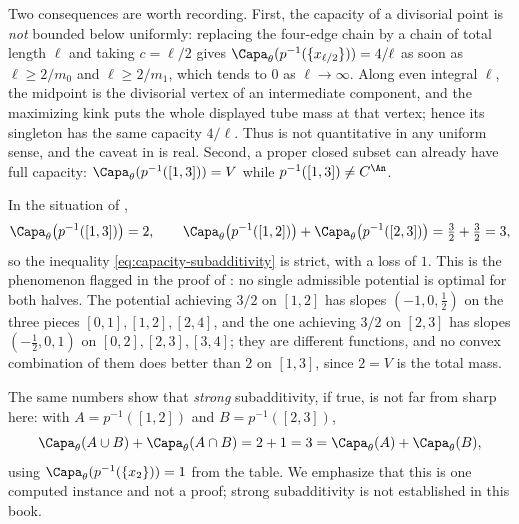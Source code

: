 \begin{example}
Two consequences are worth recording.  First, the capacity of a divisorial
point is \emph{not} bounded below uniformly: replacing the four-edge chain
by a chain of total length $\ell$ and taking $c=\ell/2$ gives
$\Capa_\theta(p^{-1}(\{x_{\ell/2}\}))=4/\ell$ as soon as
$\ell\geq2/m_0$ and $\ell\geq2/m_1$, which tends to $0$ as
$\ell\to\infty$.  Along even integral $\ell$, the midpoint is the
divisorial vertex of an intermediate component, and the maximizing kink
puts the whole displayed tube mass at that vertex; hence its singleton has
the same capacity $4/\ell$.  Thus
 is not
quantitative in any uniform sense, and the caveat in
 is real.  Second, a proper closed subset
can already have full capacity: $\Capa_\theta(p^{-1}([1,3]))=V$ while
$p^{-1}([1,3])\neq C^{\An}$.
\end{example}

\begin{example}
\label{ex:ch25-subadditivity-strict}
In the situation of ,
\[
 \Capa_\theta\bigl(p^{-1}([1,3])\bigr)=2,
 \qquad
 \Capa_\theta\bigl(p^{-1}([1,2])\bigr)
 +\Capa_\theta\bigl(p^{-1}([2,3])\bigr)=\tfrac32+\tfrac32=3 ,
\]
so the inequality \eqref{eq:capacity-subadditivity} is strict, with a loss of
$1$.  This is the phenomenon flagged in the proof of
: no single admissible potential is optimal
for both halves.  The potential achieving $3/2$ on $[1,2]$ has slopes
$(-1,0,\tfrac12)$ on the three pieces $[0,1],[1,2],[2,4]$, and the one
achieving $3/2$ on $[2,3]$ has slopes
$(-\tfrac12,0,1)$ on $[0,2],[2,3],[3,4]$; they are different functions,
and no convex combination of them does better than $2$ on $[1,3]$, since
$2=V$ is the total mass.

The same numbers show that \emph{strong} subadditivity, if true, is not far
from sharp here: with $A=p^{-1}([1,2])$ and $B=p^{-1}([2,3])$,
\[
 \Capa_\theta(A\cup B)+\Capa_\theta(A\cap B)=2+1=3
 =\Capa_\theta(A)+\Capa_\theta(B),
\]
using $\Capa_\theta(p^{-1}(\{x_2\}))=1$ from the table.  We emphasize that
this is one computed instance and not a proof; strong subadditivity is not
established in this book.
\end{example}

